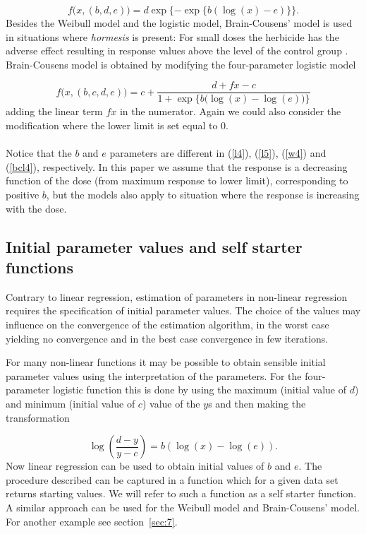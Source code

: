 \documentclass[a4paper]{article}
\begin{document}
\[
f \big(x, (b,d,e) \big) = d \exp\{ -\exp\{ b(\log (x)- e)\}  \}.
\]
Besides the Weibull model and the logistic model, Brain-Cousens' model \citep{brain&cousens:1989} is used in situations where \emph{hormesis} is present: 
For small doses the herbicide has the adverse effect resulting in response values above the level of the control group 
\citep{calabrese&baldwin:2001, calabrese&baldwin:2003}. Brain-Cousens model is obtained by modifying the four-parameter logistic model

\begin{equation} \label{bcl4}
f \big(x, (b,c,d,e) \big)=  c+\frac{d+fx-c}{1+\exp \big\{b \big( \log(x)-\log(e) \big)  \big\}}
\end{equation}
adding the linear term $fx$ in the numerator. Again we could also consider the modification where the lower limit is set equal to 0.
\\
\\
Notice that the $b$ and $e$ parameters are different in (\ref{l4}), (\ref{l5}), (\ref{w4}) and (\ref{bcl4}), respectively.
In this paper we assume that the response is a decreasing function of the dose (from maximum response to lower limit), corresponding to positive $b$, 
but the models also apply to situation where the response is increasing with the dose.


\subsection{Initial parameter values and self starter functions}

Contrary to linear regression, estimation of parameters in non-linear regression requires the specification of initial parameter values. The choice
of the values may influence on the convergence of the estimation algorithm, in the worst case yielding no convergence and in the best case convergence
in few iterations. 

For many non-linear functions it may be possible to obtain sensible initial parameter values using the interpretation of the parameters.
For the four-parameter logistic function this is done by using the maximum (initial value of $d$) and minimum (initial value of $c$) value of the $y$s and 
then making the transformation

\begin{equation}
\log\left(\frac{d-y}{y-c}\right)=b(\log(x)-\log(e)).
\end{equation}
Now linear regression can be used to obtain initial values of $b$ and $e$. The procedure described can be captured in a function which for a given data
set returns starting values. We will refer to such a function as a self starter function.
A similar approach can be used for the Weibull model and Brain-Cousens' model. For another example see section~\ref{sec:7}.
\end{document}
